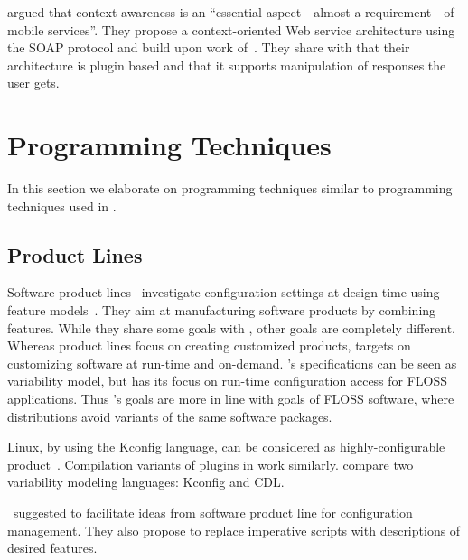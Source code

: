\citet{kapitsaki2008architecture} argued that context awareness is an \enquote{essential aspect---almost a requirement---of mobile services}.
They propose a context-oriented Web service architecture using the SOAP protocol and build upon work of~\citet{keidl2004towards}.
They share with \elektra{} that their architecture is plugin based and that it supports manipulation of responses the user gets.













\section{Programming Techniques}
\label{sec:related-programming}


In this section we elaborate on programming techniques similar to programming techniques used in \elektra{}.

\subsection{Product Lines}

Software product lines~\cite{pohl2005software,schaefer2011formal,berger2015feature,midtgaard2014systematic} investigate configuration settings at design time using feature models~\cite{lee2002concepts}.
They aim at manufacturing software products by combining features.
While they share some goals with \elektra{}, other goals are completely different.
Whereas product lines focus on creating customized products, \elektra{} targets on customizing software at run-time and on-demand.
\elektra{}'s specifications can be seen as variability model, but \elektra{} has its focus on run-time configuration access for FLOSS applications.
Thus \elektra{}'s goals are more in line with goals of FLOSS software, where distributions avoid variants of the same software packages.

Linux, by using the Kconfig language, can be considered as highly-configurable product~\cite{passos2015feature}.
Compilation variants of plugins in \elektra{} work similarly.
\citet{berger2010variability} compare two variability modeling languages: Kconfig and CDL.

\citet{leite2016computing}~suggested to facilitate ideas from software product line for configuration management.
They also propose to replace imperative scripts with descriptions of desired features.


